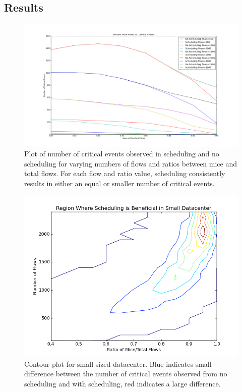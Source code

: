 \fi

\subsection{Results}

\begin{figure}
	\centering
	\includegraphics[width=\columnwidth]{crit_plot.png}
	\caption{Plot of number of critical events observed in scheduling and no
    scheduling for varying numbers of flows and ratios between mice and total
    flows. For each flow and ratio value, scheduling consistently results in
    either an equal or smaller number of critical events.}
	\label{fig:critplt}
\end{figure}

\begin{figure}
	\centering
	\includegraphics[width=\columnwidth]{small_datacenter.png}
	\caption{Contour plot for small-sized datacenter. Blue indicates small
    difference between the number of critical events observed from no
    scheduling and with scheduling, red indicates a large difference.}
	\label{fig:smalldc}
\end{figure}

